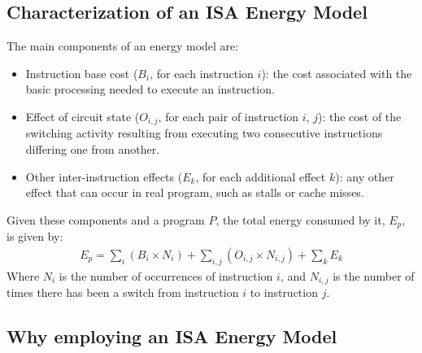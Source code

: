 \subsection{Characterization of an ISA Energy Model}
The main components of an energy model are:
\begin{itemize}
\item Instruction base cost ($B_{i}$, for each instruction $i$): the cost associated with the basic processing needed to execute an instruction. 
\item Effect of circuit state ($O_{i,j}$, for each pair of instruction $i$, $j$): the cost of the switching activity resulting from executing two consecutive instructions differing one from another.
\item Other inter-instruction effects ($E_{k}$, for each additional effect $k$): any other effect that can occur in real program, such as stalls or cache misses.
\end{itemize}
\par Given these components and a program $P$, the total energy consumed by it, $E_{p}$, is given by:
\begin{gather*}
E_{p} = \sum_{i} (B_{i} \times N_{i}) + \sum_{i,j} (O_{i,j} \times N_{i,j}) + \sum_{k} E_{k}
\end{gather*}
Where $N_{i}$ is the number of occurrences of instruction $i$, and $N_{i,j}$ is the number of times there has been a switch from instruction $i$ to instruction $j$.

\subsection{Why employing an ISA Energy Model}